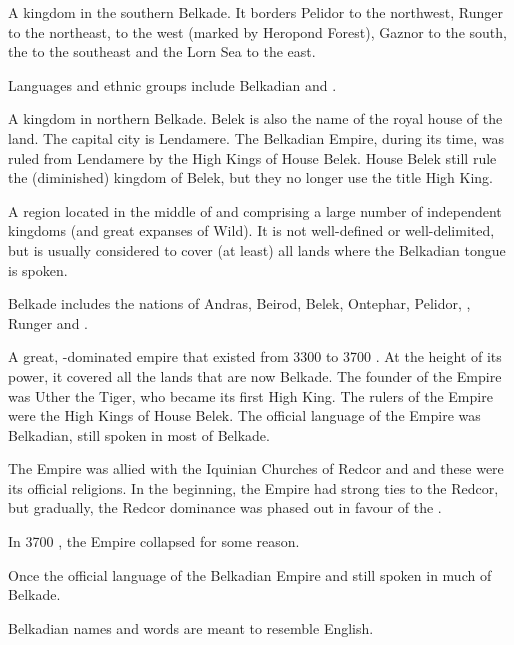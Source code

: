 A kingdom in the southern Belkade. It borders Pelidor to the northwest, Runger to the northeast, \Scyrum{} to the west (marked by Heropond Forest), Gaznor to the south, the \Risvaelsea{} to the southeast and the Lorn Sea to the east.  

Languages and ethnic groups include Belkadian and \Ortic. 



A kingdom in northern Belkade. Belek is also the name of the royal house of the land. The capital city is Lendamere. The Belkadian Empire, during its time, was ruled from Lendamere by the High Kings of House Belek. House Belek still rule the (diminished) kingdom of Belek, but they no longer use the title High King. 



A region located in the middle of \KnownWorld{} and comprising a large number of independent kingdoms (and great expanses of Wild). It is not well-defined or well-delimited, but is usually considered to cover (at least) all lands where the Belkadian tongue is spoken. 


Belkade includes the nations of Andras, Beirod, Belek, Ontephar, Pelidor, \Redce, Runger and \Scyrum. 



A great, \human{}-dominated empire that existed from 3300 to 3700 \IC{}. At the height of its power, it covered all the lands that are now Belkade. The founder of the Empire was Uther the Tiger, who became its first High King. The rulers of the Empire were the High Kings of House Belek. The official language of the Empire was Belkadian, still spoken in most of Belkade. 

The Empire was allied with the Iquinian Churches of Redcor and \Yrgell{} and these were its official religions. In the beginning, the Empire had strong ties to the Redcor, but gradually, the Redcor dominance was phased out in favour of the \Yrgell. 

In 3700 \IC{}, the Empire collapsed for some reason. 



Once the official language of the Belkadian Empire and still spoken in much of Belkade. 

Belkadian names and words are meant to resemble English. 



